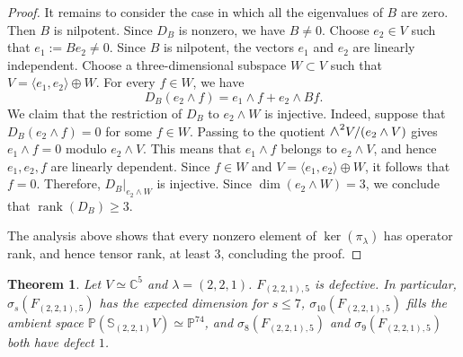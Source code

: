 \documentclass[a4paper,reqno]{amsart}
\theoremstyle{plainnopunct}
\newtheorem{theorem}{Theorem}[section]
\theoremstyle{definitionnopunct}
\newcommand{\superwedge}{\mathlarger{\mathlarger{\wedge}}}
\newcommand{\C}{\mathbb{C}}
\renewcommand{\P}{\mathbb{P}}
\renewcommand{\S}{\mathbb{S}}
\newcommand{\rank}{\operatorname{rank}}
\begin{document}
\begin{proof}
It remains to consider the case in which all the eigenvalues of $B$ are zero. Then $B$ is nilpotent. Since $D_B$ is nonzero, we have $B\neq0$. Choose $e_2\in V$ such that $e_1:=Be_2\neq0$. Since $B$ is nilpotent, the vectors $e_1$ and $e_2$ are linearly independent. Choose a three-dimensional subspace $W\subset V$ such that $V=\langle e_1,e_2\rangle\oplus W$.
For every $f\in W$, we have
\[
D_B(e_2\wedge f)=e_1\wedge f+e_2\wedge Bf.
\]
We claim that the restriction of $D_B$ to $e_2\wedge W$ is injective. Indeed, suppose that $D_B(e_2\wedge f)=0$ for some $f\in W$. Passing to the quotient $\superwedge^2V/(e_2\wedge V)$ gives $e_1\wedge f=0$ modulo $e_2\wedge V$. This means that $e_1\wedge f$ belongs to $e_2\wedge V$, and hence $e_1,e_2,f$ are linearly dependent. Since $f\in W$ and $V=\langle e_1,e_2\rangle\oplus W$, it follows that $f=0$. Therefore, $D_B|_{e_2\wedge W}$ is injective. Since $\dim(e_2\wedge W)=3$, we conclude that $\rank(D_B)\geq3$.

The analysis above shows that every nonzero element of $\ker(\pi_\lambda)$ has operator rank, and hence tensor rank, at least $3$, concluding the proof.
\end{proof}



\begin{theorem}\label{thm: def of F235}
    Let $V\simeq\C^5$ and $\lambda=(2,2,1)$. $F_{(2,2,1),5}$ is defective. In particular, $\sigma_s(F_{(2,2,1),5})$ has the expected dimension for $s\le7$, $\sigma_{10}(F_{(2,2,1),5})$ fills the ambient space $\P(\S_{(2,2,1)} V)\simeq\P^{74}$, and $\sigma_8(F_{(2,2,1),5})$ and
$\sigma_9(F_{(2,2,1),5})$ both have defect $1$.
\end{theorem}
\end{document}
